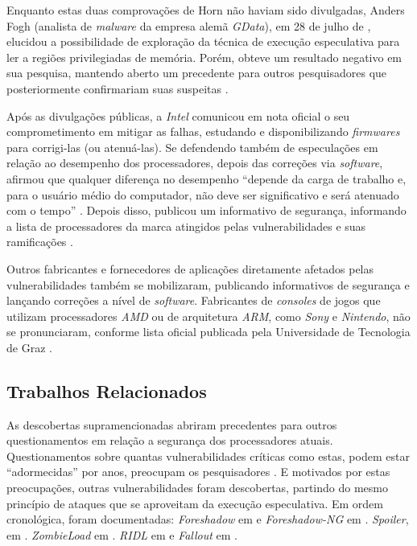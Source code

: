 \documentclass[
	article,			    %
	12pt,				    %
	oneside,			    %
	a4paper,			    %
	chapter=TITLE,		    %
	section=TITLE,		    %
	subsection=TITLE,	    %
	english,			    %
	brazil,				    %
	sumario=tradicional
]{abntex2}
\begin{document}
Enquanto estas duas comprovações de Horn não haviam sido divulgadas, Anders Fogh (analista de \emph{malware} da empresa alemã \emph{GData}), em 28 de julho de \citeyear{Anders2017Reading}, elucidou a possibilidade de exploração da técnica de execução especulativa para ler a regiões privilegiadas de memória. Porém, obteve um resultado negativo em sua pesquisa, mantendo aberto um precedente para outros pesquisadores que posteriormente confirmariam suas suspeitas \cite{Andy2018Triple}.

Após as divulgações públicas, a \emph{Intel} comunicou em nota oficial o seu comprometimento em mitigar as falhas, estudando e disponibilizando \emph{firmwares} para corrigi-las (ou atenuá-las). Se defendendo também de especulações em relação ao desempenho dos processadores, depois das correções via \emph{software}, afirmou que qualquer diferença no desempenho ``depende da carga de trabalho e, para o usuário médio do computador, não deve ser significativo e será atenuado com o tempo'' \cite{Intel2018NewsIssues}. Depois disso, publicou um informativo de segurança, informando a lista de processadores da marca atingidos pelas vulnerabilidades e suas ramificações \cite{Intel2018SA00088}.

Outros fabricantes e fornecedores de aplicações diretamente afetados pelas vulnerabilidades também se mobilizaram, publicando informativos de segurança e lançando correções a nível de \emph{software}. Fabricantes de \emph{consoles} de jogos que utilizam processadores \emph{AMD} ou de arquitetura \emph{ARM}, como \emph{Sony} e \emph{Nintendo}, não se pronunciaram, conforme lista oficial publicada pela Universidade de Tecnologia de Graz \cite{Graz2018Meltdown}.

\subsection{Trabalhos Relacionados}
As descobertas supramencionadas abriram precedentes para outros questionamentos em relação a segurança dos processadores atuais. Questionamentos sobre quantas vulnerabilidades críticas como estas, podem estar ``adormecidas'' por anos, preocupam os pesquisadores \cite{Andy2018Triple}. E motivados por estas preocupações, outras vulnerabilidades foram descobertas, partindo do mesmo princípio de ataques que se aproveitam da execução especulativa. Em ordem cronológica, foram documentadas: \emph{Foreshadow} em  e \emph{Foreshadow-NG} em . \emph{Spoiler}, em . \emph{ZombieLoad} em . \emph{RIDL} em  e \emph{Fallout} em .
\end{document}
